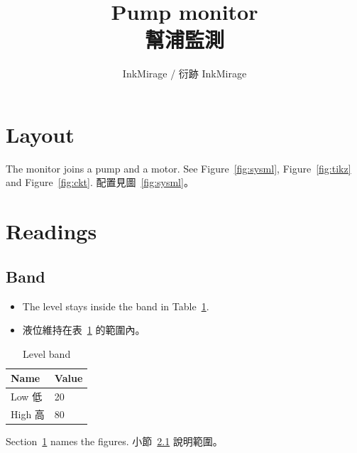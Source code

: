 \title{Pump monitor\\幫浦監測}
\author{InkMirage / 衍跡 InkMirage}
\maketitle

\section{Layout}
\label{sec:layout}

The monitor joins a pump and a motor. See Figure~\ref{fig:sysml}, Figure~\ref{fig:tikz} and Figure~\ref{fig:ckt}. 配置見圖~\ref{fig:sysml}。

\section{Readings}
\label{sec:readings}

\subsection{Band}
\label{sec:band}

\begin{itemize}
\item The level stays inside the band in Table~\ref{tab:band}.
\item 液位維持在表~\ref{tab:band} 的範圍內。
\end{itemize}

\begin{table}[ht]
\caption{Level band\label{tab:band}}
\centering
\begin{tabular}{ll}
\hline
Name & Value \\
\hline
Low 低 & 20 \\
High 高 & 80 \\
\hline
\end{tabular}
\end{table}

Section~\ref{sec:layout} names the figures. 小節~\ref{sec:band} 說明範圍。

